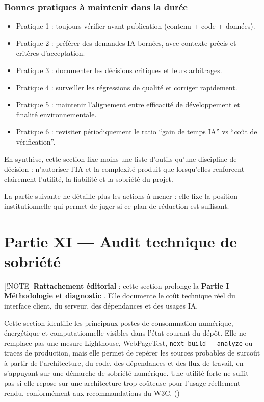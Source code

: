 \documentclass[
  10pt,
  a4paper,
  DIV=11,
  numbers=noendperiod,
  oneside]{scrreprt}
\providecommand{\tightlist}{%
  \setlength{\itemsep}{0pt}\setlength{\parskip}{0pt}}
\let\oldtextbf\textbf
\renewcommand{\textbf}[1]{\oldtextbf{\textcolor{cmmnavy}{#1}}}
\begin{document}
\subsection{Bonnes pratiques à maintenir dans la
durée}\label{bonnes-pratiques-uxe0-maintenir-dans-la-duruxe9e}

\begin{itemize}
\tightlist
\item
  Pratique 1 : toujours vérifier avant publication (contenu + code +
  données).
\item
  Pratique 2 : préférer des demandes IA bornées, avec contexte précis et
  critères d'acceptation.
\item
  Pratique 3 : documenter les décisions critiques et leurs arbitrages.
\item
  Pratique 4 : surveiller les régressions de qualité et corriger
  rapidement.
\item
  Pratique 5 : maintenir l'alignement entre efficacité de développement
  et finalité environnementale.
\item
  Pratique 6 : revisiter périodiquement le ratio ``gain de temps IA'' vs
  ``coût de vérification''.
\end{itemize}

En synthèse, cette section fixe moins une liste d'outils qu'une
discipline de décision : n'autoriser l'IA et la complexité produit que
lorsqu'elles renforcent clairement l'utilité, la fiabilité et la
sobriété du projet.

La partie suivante ne détaille plus les actions à mener : elle fixe la
position institutionnelle qui permet de juger si ce plan de réduction
est suffisant.

\chapter{Partie XI --- Audit technique de
sobriété}\label{partie-xi-audit-technique-de-sobriete}

{[}!NOTE{]} \textbf{Rattachement éditorial} : cette section prolonge la
\textbf{Partie I --- Méthodologie et diagnostic} . Elle documente le
coût technique réel du interface client, du serveur, des dépendances et
des usages IA.

Cette section identifie les principaux postes de consommation numérique,
énergétique et computationnelle visibles dans l'état courant du dépôt.
Elle ne remplace pas une mesure Lighthouse, WebPageTest,
\texttt{next\ build\ -\/-analyze} ou traces de production, mais elle
permet de repérer les sources probables de surcoût à partir de
l'architecture, du code, des dépendances et des flux de travail, en
s'appuyant sur une démarche de sobriété numérique. Une utilité forte ne
suffit pas si elle repose sur une architecture trop coûteuse pour
l'usage réellement rendu, conformément aux recommandations du W3C.
()
\end{document}
